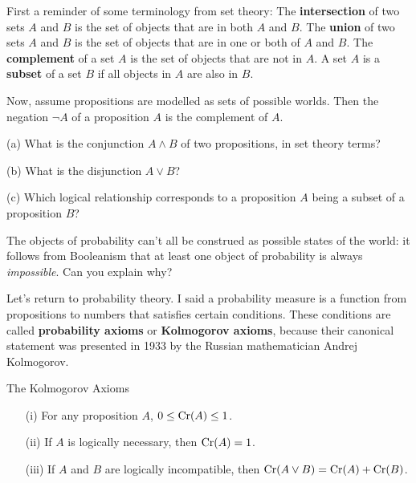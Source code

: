 \begin{exercise2}
  First a reminder of some terminology from set theory: 
  The \textbf{intersection} of two sets $A$ and $B$ is the set of
  objects that are in both $A$ and $B$. The \textbf{union} of two sets
  $A$ and $B$ is the set of objects that are in one or both of $A$ and
  $B$. The \textbf{complement} of a set $A$ is the set of objects that
  are not in $A$. A set $A$ is a \textbf{subset} of a set $B$ if all
  objects in $A$ are also in $B$.

  Now, assume propositions are modelled as sets of possible
  worlds. Then the negation $\neg A$ of a proposition $A$ is the
  complement of $A$.
  \begin{exlist}
  \item[(a)] What is the conjunction $A \land B$ of two propositions,
    in set theory terms?
  \item[(b)] What is the disjunction $A \lor B$?
  \item[(c)] Which logical relationship corresponds to a proposition $A$ being a
    subset of a proposition $B$?
  \end{exlist}
\end{exercise2}

\begin{exercise2}
  The objects of probability can't all be construed as possible states
  of the world: it follows from Booleanism that at least one object of
  probability is always \emph{impossible}. Can you explain why?
\end{exercise2}
  

Let's return to probability theory. I said a probability measure is a
function from propositions to numbers that satisfies certain
conditions.  These conditions are called \textbf{probability
  axioms} or \textbf{Kolmogorov axioms}, because their canonical
statement was presented in 1933 by the Russian mathematician Andrej Kolmogorov.
\begin{genericthm}{The Kolmogorov Axioms}
  \leavevmode\vspace{-2em}
  \begin{itemize}
  \itemsep0em 
  \item[(i)] For any proposition $A$, $0 \leq \text{Cr}(A) \leq 1$.
  \item[(ii)] If $A$ is logically necessary, then $\text{Cr}(A) = 1$.
  \item[(iii)] If $A$ and $B$ are logically incompatible, then $\text{Cr}(A \lor B) = \text{Cr}(A) + \text{Cr}(B)$.
  \end{itemize}
\end{genericthm}

